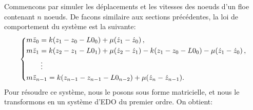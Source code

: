 Commencons par simuler les déplacements et les vitesses des noeuds d'un floe contenant $n$ noeuds. De facons similaire aux sections précédentes, la loi de comportement du système est la suivante:
\begin{align} \label{eq:multiressortsdep}
    \begin{dcases}
        m\ddot z_0 = k(z_1 - z_0 - L0_0) + \mu (\dot z_1 - \dot z_0)\, , \\
        m\ddot z_1 =  k(z_2 - z_1 - L0_1) + \mu (\dot z_2 - \dot z_1) - k(z_1 - z_0 - L0_0) - \mu (\dot z_1 - \dot z_0) \,, \\
        \qquad \vdots \\
        m\ddot z_{n-1} = k(z_{n-1} - z_{n-1} - L0_{n-2}) + \mu (\dot z_{n} - \dot z_{n-1}). 
    \end{dcases}
\end{align}
Pour résoudre ce système, nous le posons sous forme matricielle, et nous le transformons en un système d'EDO du premier ordre. On obtient:
